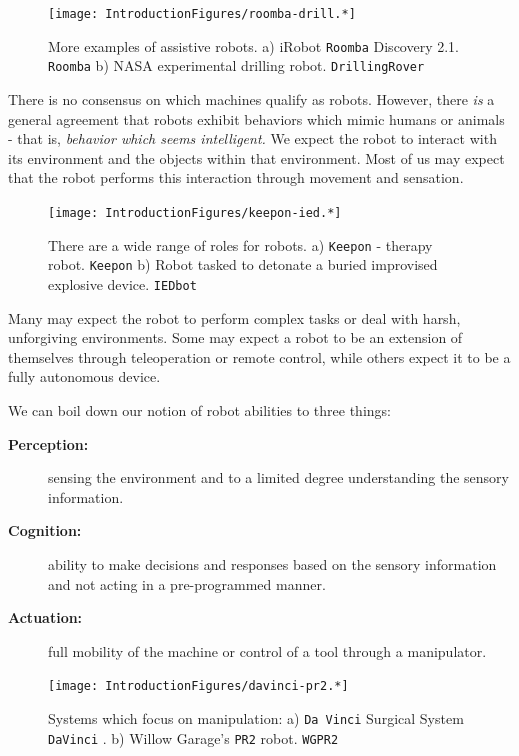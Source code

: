 \begin{figure}
\centering
\texttt{[image: IntroductionFigures/roomba-drill.*]}
\caption{More examples of assistive robots. a) iRobot \texttt{Roomba}
Discovery 2.1. \texttt{Roomba} b) NASA experimental drilling robot.
\texttt{DrillingRover}}
\end{figure}

There is no consensus on which machines qualify as robots. However,
there \emph{is} a general agreement that robots exhibit behaviors which
mimic humans or animals - that is, \emph{behavior which seems
intelligent.} We expect the robot to interact with its environment and
the objects within that environment. Most of us may expect that the
robot performs this interaction through movement and sensation.

\begin{figure}
\centering
\texttt{[image: IntroductionFigures/keepon-ied.*]}
\caption{There are a wide range of roles for robots. a) \texttt{Keepon}
- therapy robot. \texttt{Keepon} b) Robot tasked to detonate a buried
improvised explosive device. \texttt{IEDbot}}
\end{figure}

Many may expect the robot to perform complex tasks or deal with harsh,
unforgiving environments. Some may expect a robot to be an extension of
themselves through teleoperation or remote control, while others expect
it to be a fully autonomous device.

We can boil down our notion of robot abilities to three things:

\begin{description}
\item[\textbf{Perception:}]
sensing the environment and to a limited degree understanding the
sensory information.
\item[\textbf{Cognition:}]
ability to make decisions and responses based on the sensory information
and not acting in a pre-programmed manner.
\item[\textbf{Actuation:}]
full mobility of the machine or control of a tool through a manipulator.
\end{description}

\begin{figure}
\centering
\texttt{[image: IntroductionFigures/davinci-pr2.*]}
\caption{Systems which focus on manipulation: a) \texttt{Da\ Vinci}
Surgical System \texttt{DaVinci} . b) Willow Garage's \texttt{PR2}
robot. \texttt{WGPR2}}
\end{figure}


